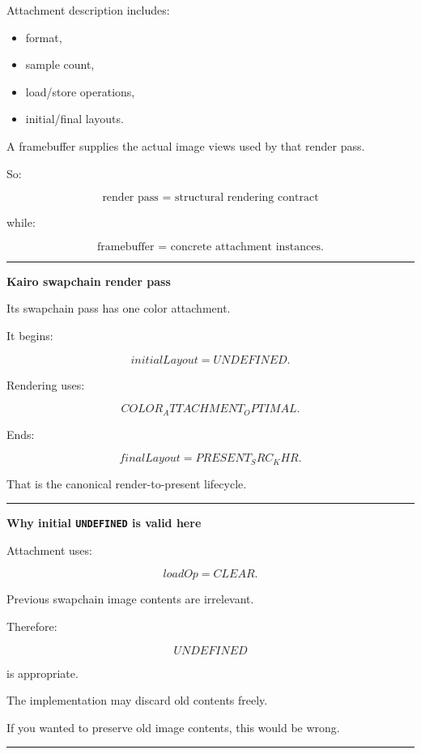 Attachment description includes:

\begin{itemize}
\tightlist
\item
  format,
\item
  sample count,
\item
  load/store operations,
\item
  initial/final layouts.
\end{itemize}

A framebuffer supplies the actual image views used by that render pass.

So:

\[
\boxed{
\text{render pass = structural rendering contract}
}
\]

while:

\[
\boxed{
\text{framebuffer = concrete attachment instances}.
}
\]

\begin{center}\rule{0.5\linewidth}{0.5pt}\end{center}

\textbf{Kairo swapchain render pass}

Its swapchain pass has one color attachment.

It begins:

\[
initialLayout=
UNDEFINED.
\]

Rendering uses:

\[
COLOR_ATTACHMENT_OPTIMAL.
\]

Ends:

\[
finalLayout=
PRESENT_SRC_KHR.
\]

That is the canonical render-to-present lifecycle.

\begin{center}\rule{0.5\linewidth}{0.5pt}\end{center}

\textbf{Why initial \texttt{UNDEFINED} is valid here}

Attachment uses:

\[
loadOp=CLEAR.
\]

Previous swapchain image contents are irrelevant.

Therefore:

\[
UNDEFINED
\]

is appropriate.

The implementation may discard old contents freely.

If you wanted to preserve old image contents, this would be wrong.

\begin{center}\rule{0.5\linewidth}{0.5pt}\end{center}

